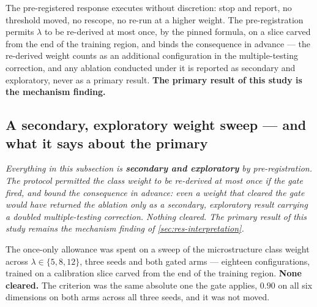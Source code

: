 The pre-registered response executes without discretion: stop and report, no threshold moved, no
rescope, no re-run at a higher weight. The pre-registration permits $\lambda$ to be re-derived at
most once, by the pinned formula, on a slice carved from the end of the training region, and binds
the consequence in advance --- the re-derived weight counts as an additional configuration in the
multiple-testing correction, and any ablation conducted under it is reported as
secondary and exploratory, never as a primary result. \textbf{The primary result of this study is
the mechanism finding.}

\subsection{A secondary, exploratory weight sweep --- and what it says about the primary}
\label{sec:res-lambda}

\emph{Everything in this subsection is \textbf{secondary and exploratory} by pre-registration. The
protocol permitted the class weight to be re-derived at most once if the gate fired, and bound the
consequence in advance: even a weight that cleared the gate would have returned the ablation only
as a secondary, exploratory result carrying a doubled multiple-testing correction. Nothing cleared.
The primary result of this study remains the mechanism finding of \cref{sec:res-interpretation}.}

The once-only allowance was spent on a sweep of the microstructure class weight across
$\lambda \in \{5, 8, 12\}$, three seeds and both gated arms --- eighteen configurations, trained on
a calibration slice carved from the end of the training region. \textbf{None cleared.} The
criterion was the same absolute one the gate applies, $0.90$ on all six dimensions on both arms
across all three seeds, and it was not moved.

